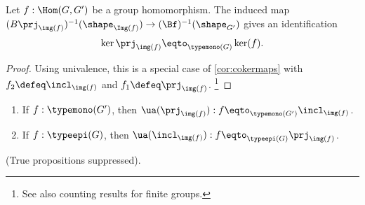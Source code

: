 \begin{lemma}
  \label{lem:kerandcoker}
  Let $f:\Hom(G,G')$ be a group homomorphism.
  The induced map $(B\prj_{\img(f)})^{-1}(\sh_{\Img(f)})\to (\Bf)^{-1}(\sh_{G'})$ gives an identification
  \[
    \ker\prj_{\img(f)}\eqto _{\typemono(G)} \ker(f).
  \]
\end{lemma}
\begin{proof}
  Using univalence, this is a special case of \cref{cor:cokermaps} with $f_2\defeq\incl_{\img(f)}$ and $f_1\defeq\prj_{\img(f)}$.
  \footnote{%
    See also counting results for finite groups.
  }
\end{proof}
\begin{xca}
  \begin{enumerate}
  \item If $f:\typemono(G')$, then $\ua(\prj_{\img(f)}):f\eqto _{\typemono(G')}\incl_{\img(f)}$.
  \item If $f:\typeepi(G)$, then $\ua(\incl_{\img(f)}):f\eqto _{\typeepi(G)}\prj_{\img(f)}$.
  \end{enumerate}
(True propositions suppressed).
\end{xca}




